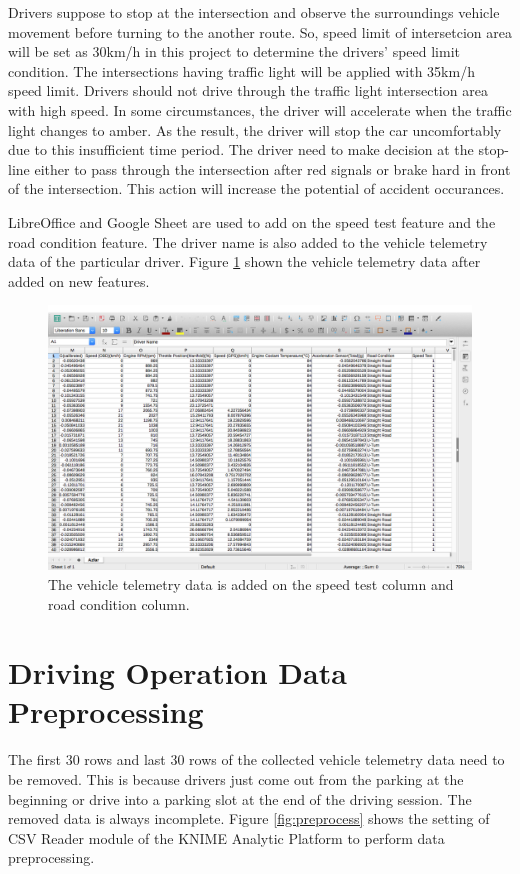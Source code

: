 Drivers suppose to stop at the intersection and observe the surroundings vehicle movement before turning to the another route. So, speed limit of intersetcion area will be set as 30km/h in this project to determine the drivers' speed limit condition. The intersections having traffic light will be applied with 35km/h speed limit. Drivers should not drive through the traffic light intersection area with high speed. In some circumstances, the driver will accelerate when the traffic light changes to amber. As the result, the driver will stop the car uncomfortably due to this insufficient time period. The driver need to make decision at the stop-line either to pass through the intersection after red signals or brake hard in front of the intersection. This action will increase the potential of accident occurances.\cite{kulanthayan:phang:hayati:2007}

LibreOffice and Google Sheet are used to add on the speed test feature and the road condition feature. The driver name is also added to the vehicle telemetry data of the particular driver. Figure \ref{fig:speedtest} shown the vehicle telemetry data after added on new features.

\begin{figure}[hbt!]\centering
\includegraphics[width=.75\textwidth]{image/LOspeedtest}
\caption{The vehicle telemetry data is added on the speed test column and road condition column.}
\label{fig:speedtest}
\end{figure}


\section{Driving Operation Data Preprocessing}
The first 30 rows and last 30 rows of the collected vehicle telemetry data need to be removed. This is because drivers just come out from the parking at the beginning or drive into a parking slot at the end of the driving session. The removed data is always incomplete. Figure \ref{fig:preprocess} shows the setting of CSV Reader module of the KNIME Analytic Platform to perform data preprocessing.

